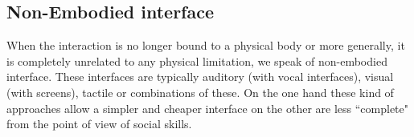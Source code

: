 \documentclass{thesisreport}
\begin{document}
\subsection{Non-Embodied interface}
When the interaction is no longer bound to a physical body or more generally, it is completely unrelated to any physical limitation, we speak of non-embodied interface. These interfaces are typically auditory (with vocal interfaces), visual (with screens), tactile or combinations of these. On the one hand these kind of approaches allow a simpler and cheaper interface on the other are less “complete" from the point of view of social skills.




\end{document}
